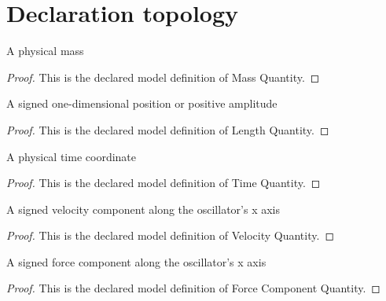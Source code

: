 \section{Declaration topology}
\begin{definition}
  \label{def:physics:phyx-mini-0275:phyxminiproblems-problemphyxmini0275-massquantity}
  A physical mass
\end{definition}
\begin{proof}
  This is the declared model definition of Mass Quantity.
\end{proof}
\begin{definition}
  \label{def:physics:phyx-mini-0275:phyxminiproblems-problemphyxmini0275-lengthquantity}
  A signed one-dimensional position or positive amplitude
\end{definition}
\begin{proof}
  This is the declared model definition of Length Quantity.
\end{proof}
\begin{definition}
  \label{def:physics:phyx-mini-0275:phyxminiproblems-problemphyxmini0275-timequantity}
  A physical time coordinate
\end{definition}
\begin{proof}
  This is the declared model definition of Time Quantity.
\end{proof}
\begin{definition}
  \label{def:physics:phyx-mini-0275:phyxminiproblems-problemphyxmini0275-velocityquantity}
  A signed velocity component along the oscillator's x axis
\end{definition}
\begin{proof}
  This is the declared model definition of Velocity Quantity.
\end{proof}
\begin{definition}
  \label{def:physics:phyx-mini-0275:phyxminiproblems-problemphyxmini0275-forcecomponentquantity}
  A signed force component along the oscillator's x axis
\end{definition}
\begin{proof}
  This is the declared model definition of Force Component Quantity.
\end{proof}
